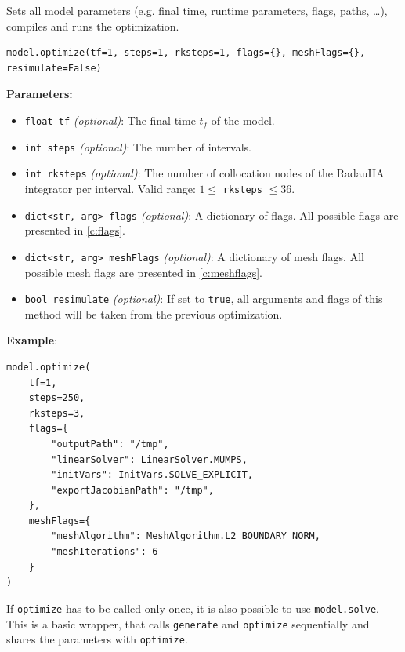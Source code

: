 \documentclass[12pt]{article}
\begin{document}
\begin{mdframed}[backgroundcolor=gray!10, roundcorner=10pt,
		linewidth=1pt]

	Sets all model parameters (e.g. final time, runtime parameters, flags,
	paths, \ldots), compiles and runs the optimization.

	\begin{lstlisting}
model.optimize(tf=1, steps=1, rksteps=1, flags={}, meshFlags={}, resimulate=False)
	\end{lstlisting}
	\label{optimize}
	\textbf{Parameters:}
	\begin{itemize}
		\item \texttt{float tf} \emph{(optional)}: The final time $t_f$
		      of the model.
		\item \texttt{int steps} \emph{(optional)}: The number of
		      intervals.
		\item \texttt{int rksteps} \emph{(optional)}: The number of
		      collocation nodes of the RadauIIA integrator per interval. Valid range: $1
			      \leq$ \texttt{rksteps} $\leq 36$.
		\item \texttt{dict<str, arg> flags} \emph{(optional)}: A
		      dictionary of flags. All possible flags are presented in \eqref{c:flags}.
		\item \texttt{dict<str, arg> meshFlags} \emph{(optional)}: A
		      dictionary of mesh flags. All possible mesh flags are presented in
		      \eqref{c:meshflags}.
		\item \texttt{bool resimulate} \emph{(optional)}: If set to
		      \texttt{true}, all arguments and flags of this method will be taken from the
		      previous optimization.
	\end{itemize}

	\textbf{Example}:
	\begin{lstlisting}
model.optimize(
	tf=1,
	steps=250,
	rksteps=3,
	flags={
		"outputPath": "/tmp",
		"linearSolver": LinearSolver.MUMPS,
		"initVars": InitVars.SOLVE_EXPLICIT,
		"exportJacobianPath": "/tmp",
	},
	meshFlags={
		"meshAlgorithm": MeshAlgorithm.L2_BOUNDARY_NORM,
		"meshIterations": 6
	}
)
	\end{lstlisting}

\end{mdframed}

If \texttt{optimize} has to be called only once, it is also possible to use
\texttt{model.solve}. This is a basic wrapper, that calls \texttt{generate} and
\texttt{optimize} sequentially and shares the parameters with
\texttt{optimize}.
\end{document}
